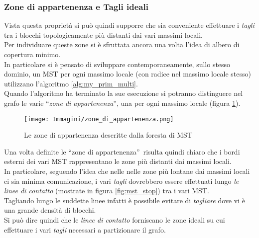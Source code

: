 {\subsubsection{Zone di appartenenza e Tagli ideali}\label{subsubsec:zone_app}
Vista questa proprietà si può quindi supporre che sia conveniente effettuare i \textit{tagli} tra i blocchi topologicamente più distanti dai vari massimi locali.\\
Per individuare queste zone si è sfruttata ancora una volta l'idea di albero di copertura minimo.\\
In particolare si è pensato di sviluppare contemporaneamente, sullo stesso dominio, un MST per ogni massimo locale (con radice nel massimo locale stesso) utilizzano l'algoritmo \ref{alg:my_prim_multi}.\\
Quando l'algoritmo ha terminato la sue esecuzione si potranno distinguere nel grafo le varie \textquotedblleft \emph{zone di appartenenza}\textquotedblright, una per ogni massimo locale (figura \ref{fig:mst_local_max}).
\begin{figure}[H]
	\centering
	\texttt{[image: Immagini/zone\_di\_appartenenza.png]}
	\caption{Le zone di appartenenza descritte dalla foresta di MST}
	\label{fig:mst_local_max}
\end{figure}

Una volta definite le \textquotedblleft zone di appartenenza\textquotedblright~risulta quindi chiaro che i bordi esterni dei vari MST rappresentano le zone più distanti dai massimi locali.\\
In particolare, seguendo l'idea che nelle nelle zone più lontane dai massimi locali ci sia minima comunicazione, i vari \textit{tagli} dovrebbero essere effettuati lungo \emph{le linee di contatto} (mostrate in figura \ref{fig:mst_stop}) tra i vari MST.\\
Tagliando lungo le suddette linee infatti è possibile evitare di \textit{tagliare} dove vi è una grande densità di blocchi.\\
Si può dire quindi che le \textit{linee di contatto} forniscano le zone ideali su cui effettuare i vari \textit{tagli} necessari a partizionare il grafo.

}
